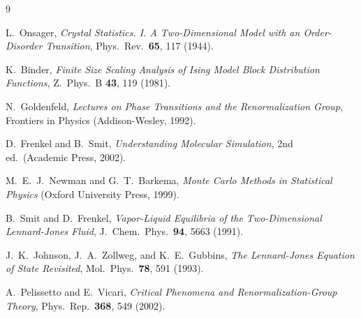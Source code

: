 \documentclass[12pt,a4paper]{article}
\begin{document}
\begin{thebibliography}{9}

L.~Onsager,
\textit{Crystal Statistics. I. A Two-Dimensional Model with an Order-Disorder Transition},
Phys.\ Rev.\ \textbf{65}, 117 (1944).

K.~Binder,
\textit{Finite Size Scaling Analysis of Ising Model Block Distribution Functions},
Z.\ Phys.\ B \textbf{43}, 119 (1981).

N.~Goldenfeld,
\textit{Lectures on Phase Transitions and the Renormalization Group},
Frontiers in Physics (Addison-Wesley, 1992).

D.~Frenkel and B.~Smit,
\textit{Understanding Molecular Simulation}, 2nd ed.\ (Academic Press, 2002).

M.~E.~J.~Newman and G.~T.~Barkema,
\textit{Monte Carlo Methods in Statistical Physics}
(Oxford University Press, 1999).

B.~Smit and D.~Frenkel,
\textit{Vapor-Liquid Equilibria of the Two-Dimensional Lennard-Jones Fluid},
J.\ Chem.\ Phys.\ \textbf{94}, 5663 (1991).

J.~K.~Johnson, J.~A.~Zollweg, and K.~E.~Gubbins,
\textit{The Lennard-Jones Equation of State Revisited},
Mol.\ Phys.\ \textbf{78}, 591 (1993).

A.~Pelissetto and E.~Vicari,
\textit{Critical Phenomena and Renormalization-Group Theory},
Phys.\ Rep.\ \textbf{368}, 549 (2002).

\end{thebibliography}
\end{document}
